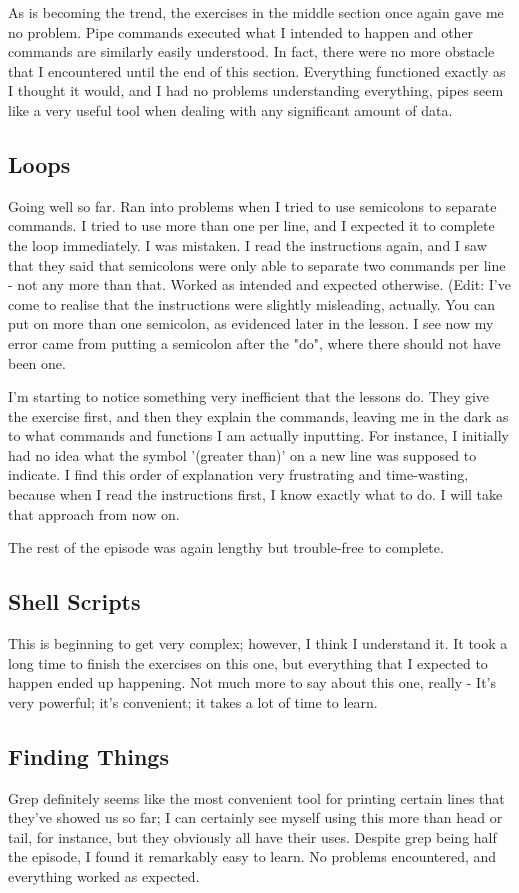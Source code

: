 \documentclass{article}
\begin{document}
As is becoming the trend, the exercises in the middle section once again gave me no problem. Pipe commands executed what I intended to happen and other commands are similarly easily understood. In fact, there were no more obstacle that I encountered until the end of this section. Everything functioned exactly as I thought it would, and I had no problems understanding everything, pipes seem like a very useful tool when dealing with any significant amount of data.

\subsection{Loops}
Going well so far. Ran into problems when I tried to use semicolons to separate commands. I tried to use more than one per line, and I expected it to complete the loop immediately. I was mistaken. I read the instructions again, and I saw that they said that semicolons were only able to separate two commands per line - not any more than that. Worked as intended and expected otherwise. (Edit: I've come to realise that the instructions were slightly misleading, actually. You can put on more than one semicolon, as evidenced later in the lesson. I see now my error came from putting a semicolon after the "do", where there should not have been one.

I'm starting to notice something very inefficient that the lessons do. They give the exercise first, and then they explain the commands, leaving me in the dark as to what commands and functions I am actually inputting. For instance, I initially had no idea what the symbol '(greater than)' on a new line was supposed to indicate. I find this order of explanation very frustrating and time-wasting, because when I read the instructions first, I know exactly what to do. I will take that approach from now on.

The rest of the episode was again lengthy but trouble-free to complete.

\subsection{Shell Scripts}
This is beginning to get very complex; however, I think I understand it. It took a long time to finish the exercises on this one, but everything that I expected to happen ended up happening. Not much more to say about this one, really - It's very powerful; it's convenient; it takes a lot of time to learn.

\subsection{Finding Things}
Grep definitely seems like the most convenient tool for printing certain lines that they've showed us so far; I can certainly see myself using this more than head or tail, for instance, but they obviously all have their uses. Despite grep being half the  episode, I found it remarkably easy to learn. No problems encountered, and everything worked as expected.
\end{document}
